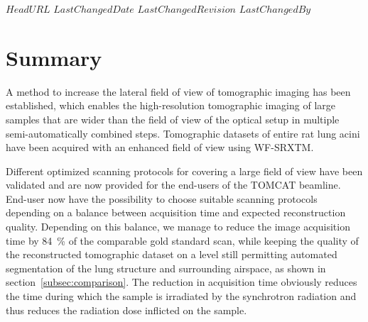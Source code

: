 \svnidlong
{$HeadURL$}
{$LastChangedDate$}
{$LastChangedRevision$}
{$LastChangedBy$}
%
\section{Summary}\label{summary}

A method to increase the lateral field of view of tomographic imaging has been established, which enables the high-resolution tomographic imaging of large samples that are wider than the field of view of the optical setup in multiple semi-automatically combined steps. Tomographic datasets of entire rat lung acini have been acquired with an enhanced field of view using WF-SRXTM.

Different optimized scanning protocols for covering a large field of view have been validated and are now provided for the end-users of the TOMCAT beamline. End-user now have the possibility to choose suitable scanning protocols depending on a balance between acquisition time and expected reconstruction quality. Depending on this balance, we manage to reduce the image acquisition time by \SI{84}{\percent} of the comparable gold standard scan, while keeping the quality of the reconstructed tomographic dataset on a level still permitting automated segmentation of the lung structure and surrounding airspace, as shown in section~\ref{subsec:comparison}. The reduction in acquisition time obviously reduces the time during which the sample is irradiated by the synchrotron radiation and thus reduces the radiation dose inflicted on the sample.